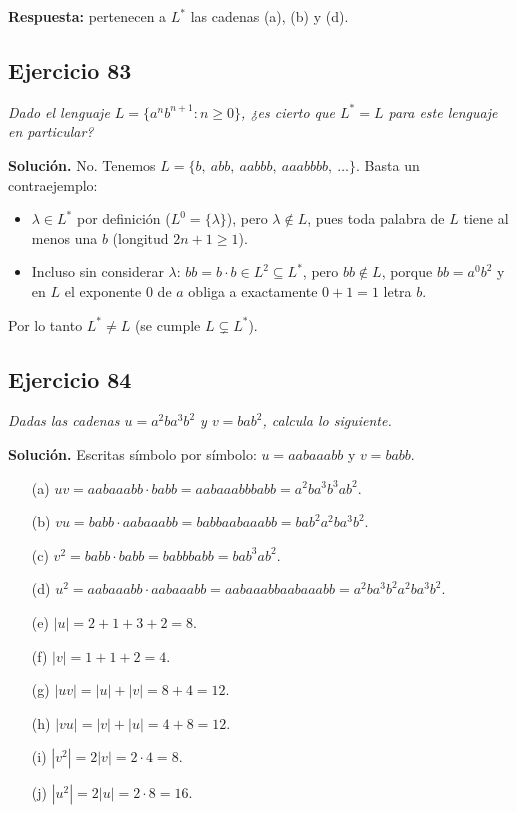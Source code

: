 \noindent\textbf{Respuesta:} pertenecen a $L^*$ las cadenas (a), (b) y (d).

\subsection*{Ejercicio 83}

\noindent\textit{Dado el lenguaje $L = \{a^n b^{n+1} : n \geq 0\}$, ¿es cierto que
    $L^* = L$ para este lenguaje en particular?}

\medskip
\noindent\textbf{Solución.} No. Tenemos
$L = \{b,\ abb,\ aabbb,\ aaabbbb,\ \dots\}$. Basta un contraejemplo:
\begin{itemize}
    \item $\lambda \in L^*$ por definición ($L^0 = \{\lambda\}$), pero
    $\lambda \notin L$, pues toda palabra de $L$ tiene al menos una $b$
    (longitud $2n + 1 \geq 1$).
    \item Incluso sin considerar $\lambda$: $bb = b \cdot b \in L^2 \subseteq L^*$,
    pero $bb \notin L$, porque $bb = a^0 b^2$ y en $L$ el exponente $0$ de $a$
    obliga a exactamente $0 + 1 = 1$ letra $b$.
\end{itemize}
Por lo tanto $L^* \neq L$ (se cumple $L \subsetneq L^*$).

\subsection*{Ejercicio 84}

\noindent\textit{Dadas las cadenas $u = a^2 b a^3 b^2$ y $v = b a b^2$, calcula lo
    siguiente.}

\medskip
\noindent\textbf{Solución.} Escritas símbolo por símbolo: $u = aabaaabb$ y
$v = babb$.

\begin{enumerate}
    \item[(a)] $uv = aabaaabb \cdot babb = aabaaabbbabb = a^2 b a^3 b^3 a b^2$.
    \item[(b)] $vu = babb \cdot aabaaabb = babbaabaaabb = b a b^2 a^2 b a^3 b^2$.
    \item[(c)] $v^2 = babb \cdot babb = babbbabb = b a b^3 a b^2$.
    \item[(d)] $u^2 = aabaaabb \cdot aabaaabb = aabaaabbaabaaabb
    = a^2 b a^3 b^2 a^2 b a^3 b^2$.
    \item[(e)] $|u| = 2 + 1 + 3 + 2 = 8$.
    \item[(f)] $|v| = 1 + 1 + 2 = 4$.
    \item[(g)] $|uv| = |u| + |v| = 8 + 4 = 12$.
    \item[(h)] $|vu| = |v| + |u| = 4 + 8 = 12$.
    \item[(i)] $|v^2| = 2|v| = 2 \cdot 4 = 8$.
    \item[(j)] $|u^2| = 2|u| = 2 \cdot 8 = 16$.
\end{enumerate}

